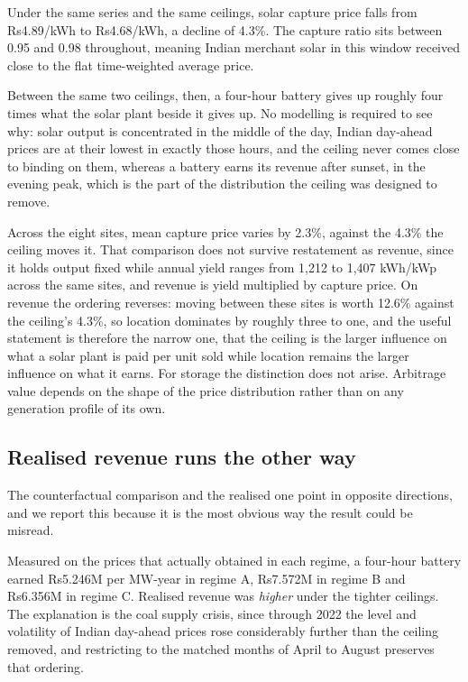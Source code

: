 \documentclass[conference,a4paper]{IEEEtran}
\begin{document}
Under the same series and the same ceilings, solar capture price falls from
Rs4.89/kWh to Rs4.68/kWh, a decline of 4.3\%. The capture ratio sits between 0.95
and 0.98 throughout, meaning Indian merchant solar in this window received
close to the flat time-weighted average price.

Between the same two ceilings, then, a four-hour battery gives up roughly four
times what the solar plant beside it gives up. No modelling is required to see why: solar output is concentrated in the middle
of the day, Indian day-ahead prices are at their lowest in exactly those hours,
and the ceiling never comes close to binding on them, whereas a battery earns
its revenue after sunset, in the evening peak, which is the part of the
distribution the ceiling was designed to remove.

Across the eight sites, mean capture price varies by 2.3\%, against the 4.3\%
the ceiling moves it. That comparison does not survive restatement as revenue,
since it holds output fixed while annual yield ranges from 1,212 to 1,407
kWh/kWp across the same sites, and revenue is yield multiplied by capture price.
On revenue the ordering reverses: moving between these sites is worth 12.6\%
against the ceiling's 4.3\%, so location dominates by roughly three to one, and
the useful statement is therefore the narrow one, that the ceiling is the larger
influence on what a solar plant is paid per unit sold while location remains the
larger influence on what it earns. For storage the distinction does not arise.
Arbitrage value depends on the shape of the price distribution rather than on
any generation profile of its own.

\subsection{Realised revenue runs the other way}

The counterfactual comparison and the realised one point in opposite directions,
and we report this because it is the most obvious way the result could be
misread.

Measured on the prices that actually obtained in each regime, a four-hour
battery earned Rs5.246M per MW-year in regime A, Rs7.572M in regime B and
Rs6.356M in regime C. Realised revenue was \emph{higher} under the tighter
ceilings. The explanation is the coal supply crisis, since through 2022 the
level and volatility of Indian day-ahead prices rose considerably further than
the ceiling removed, and restricting to the matched months of April to August
preserves that ordering.
\end{document}
